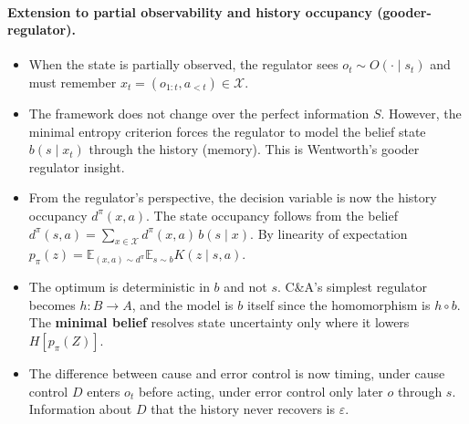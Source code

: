 \documentclass[10pt]{article}
\begin{document}
\paragraph{Extension to partial observability and history occupancy (gooder-regulator).}
\begin{itemize}
  \item When the state is partially observed, the regulator sees $o_t \sim O(\cdot \mid s_t)$ and must remember $x_t = (o_{1:t}, a_{<t}) \in \mathcal X$.
  \item The framework does not change over the perfect information $S$. However, the minimal entropy criterion forces the regulator to model the belief state $b(s \mid x_t)$ through the history (memory). This is Wentworth's gooder regulator insight.
  \item From the regulator's perspective, the decision variable is now the history occupancy $d^\pi(x,a)$. The state occupancy follows from the belief $d^\pi(s,a) = \sum_{x \in \mathcal X} d^\pi(x,a)\, b(s \mid x)$. By linearity of expectation $p_\pi(z) = \mathbb{E}_{(x,a) \sim d^\pi}\mathbb{E}_{s \sim b}K(z \mid s, a)$.
  \item The optimum is deterministic in $b$ and not $s$. C\&A's simplest regulator becomes $h: B \to A$, and the model is $b$ itself since the homomorphism is $h \circ b$. The \textbf{minimal belief} resolves state uncertainty only where it lowers $H[p_\pi(Z)]$.
  \item The difference between cause and error control is now timing, under cause control $D$ enters $o_t$ before acting, under error control only later $o$ through $s$. Information about $D$ that the history never recovers is $\varepsilon$.
\end{itemize}
\end{document}
